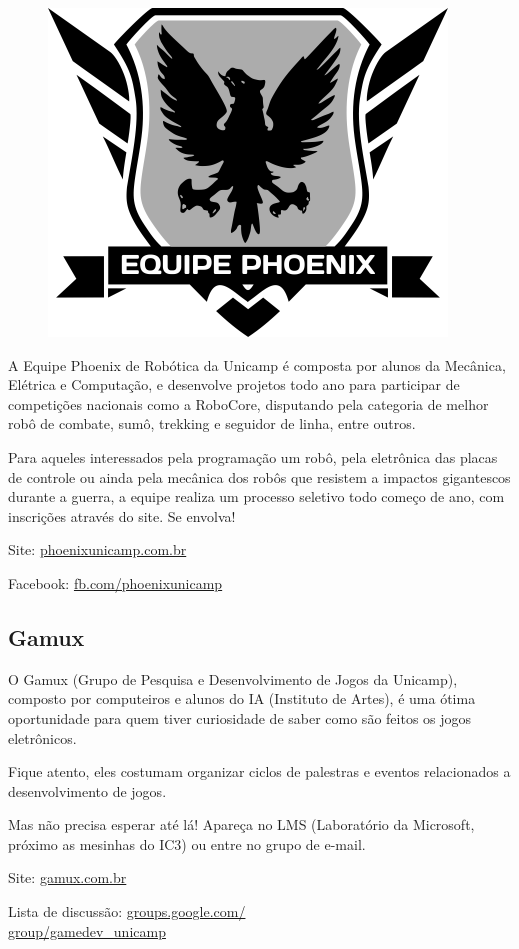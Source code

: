 \begin{figure}[h!]
    \centering
    \includegraphics[width=.35\textwidth]{img/alem_da_graduacao/phoenix_logo.png}
\end{figure}

A Equipe Phoenix de Robótica da Unicamp é composta por alunos da Mecânica,
Elétrica e Computação, e desenvolve projetos todo ano para participar de
competições nacionais como a RoboCore, disputando pela categoria de melhor robô
de combate, sumô, trekking e seguidor de linha, entre outros.

Para aqueles interessados pela programação um robô, pela eletrônica das placas
de controle ou ainda pela mecânica dos robôs que resistem a impactos gigantescos
durante a guerra, a equipe realiza um processo seletivo todo começo de ano, com
inscrições através do site. Se envolva!

\begin{compactitemize}
    \item  Site: \url{phoenixunicamp.com.br}
    \item  Facebook: \url{fb.com/phoenixunicamp}
\end{compactitemize}

\subsection{Gamux}

O Gamux (Grupo de Pesquisa e Desenvolvimento de Jogos da Unicamp), composto por
computeiros e alunos do IA (Instituto de Artes), é uma ótima oportunidade para
quem tiver curiosidade de saber como são feitos os jogos eletrônicos.

Fique atento, eles costumam organizar ciclos de palestras e eventos relacionados
a desenvolvimento de jogos.

Mas não precisa esperar até lá! Apareça no LMS (Laboratório da Microsoft,
próximo as mesinhas do IC3) ou entre no grupo de e-mail.

\begin{compactitemize}
    \item  Site: \url{gamux.com.br}
    \item  Lista de discussão: \url{groups.google.com/}\\\url{group/gamedev_unicamp}
\end{compactitemize}

